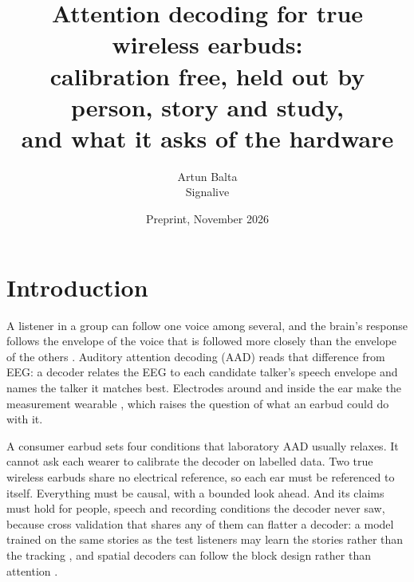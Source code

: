\documentclass[11pt]{article}
\title{Attention decoding for true wireless earbuds:\\ calibration free, held out by person, story and study,\\ and what it asks of the hardware}
\author{Artun Balta\\ \small Signalive}
\date{\small Preprint, November 2026}
\begin{document}
\maketitle

\begin{abstract}

\end{abstract}

\section{Introduction}

A listener in a group can follow one voice among several, and the brain's response follows the envelope of the voice that is followed more closely than the envelope of the others \cite{geirnaert2021}. Auditory attention decoding (AAD) reads that difference from EEG: a decoder relates the EEG to each candidate talker's speech envelope and names the talker it matches best. Electrodes around and inside the ear make the measurement wearable \cite{mirkovic2016,kidmose2013,geirnaert2025}, which raises the question of what an earbud could do with it.

A consumer earbud sets four conditions that laboratory AAD usually relaxes. It cannot ask each wearer to calibrate the decoder on labelled data. Two true wireless earbuds share no electrical reference, so each ear must be referenced to itself. Everything must be causal, with a bounded look ahead. And its claims must hold for people, speech and recording conditions the decoder never saw, because cross validation that shares any of them can flatter a decoder: a model trained on the same stories as the test listeners may learn the stories rather than the tracking \cite{puffay2023,detaillez2020}, and spatial decoders can follow the block design rather than attention \cite{rotaru2024,yan2025}.
\end{document}
